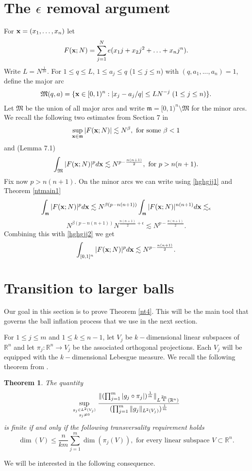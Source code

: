 \documentclass[amssymb,amsfonts,12pt]{amsart}
\newtheorem{theorem}{Theorem}[section]
\def\R{{\mathbb R}}
\def\M{{\mathfrak M}}\def\G{{\bf Gr}}\def\m{{\mathfrak m}}
\begin{document}
\section{The $\epsilon$ removal argument}
For ${\bf x}=(x_1,\ldots,x_n)$ let
$$F({\bf x};N)=\sum_{j=1}^Ne(x_1j+x_2j^2+\ldots+ x_n j^n).$$
Write $L=N^{\frac1{2n}}$. For $1\le q\le L$, $1\le a_j\le q$ ($1\le j\le n$) with $(q,a_1,...,a_n)=1$, define the major arc
$$\M(q,a)=\{\x\in[0,1)^n:|x_j-a_j/q|\le LN^{-j}\;(1\le j\le n)\}.$$
Let $\M$ be the union of all major arcs and write $\m=[0,1)^n\setminus\M$ for the minor arcs. We recall the following two estimates from Section 7 in \cite{Wool1}
\begin{equation}
\label{hghgjj1}
\sup_{\x\in\m}|F(\x;N)|\lesssim N^{\beta},\text{ for some }\beta<1
\end{equation}
and (Lemma 7.1)
\begin{equation}
\label{hghgjj2}
\int_{\M}|F(\x;N)|^{p}d\x\lesssim N^{p-\frac{n(n+1)}{2}}, \text{ for }p>n(n+1).
\end{equation}
\bigskip
Fix now $p>n(n+1)$. On the minor arcs we can write using \eqref{hghgjj1} and Theorem \ref{ntmain1}
$$\int_{\m}|F(\x;N)|^{p}d\x\lesssim N^{\beta(p-n(n+1))}\int_{\m}|F(\x;N)|^{n(n+1)}d\x\lesssim_\epsilon$$
$$N^{\beta(p-n(n+1))}N^{\frac{n(n+1)}{2}+\epsilon}\lesssim N^{p-\frac{n(n+1)}2}.$$
Combining this with \eqref{hghgjj2} we get
\begin{equation}
\label{hghgjj3}
\int_{[0,1]^n}|F({\bf x};N)|^{p}d{\bf x}\lesssim  N^{p-\frac{n(n+1)}2}.
\end{equation}

\section{Transition to larger balls}
\label{nS1}

Our goal in this section is to prove Theorem \ref{nt4}. This will be the main tool that governs the ball inflation process that we use in the next section.

For $1\le j\le m$ and $1\le k\le n-1$, let $V_j$ be $k-$dimensional linear subspaces of $\R^n$ and let $\pi_j:\R^n\to V_j$ be the associated orthogonal projections.  Each $V_j$ will be equipped with the $k-$dimensional Lebesgue measure. We recall the following theorem from \cite{BCCT}.
\begin{theorem}
\label{BCCT1}
The quantity
$$\sup_{g_j\in L^{2}({V_j})\atop{g_j\not\equiv 0}}\frac{\|(\prod_{j=1}^{m}|g_j\circ \pi_j|)^{\frac1{m}}\|_{L^{\frac{2n}{k}}(\R^n)}}{(\prod_{j=1}^{m}\|g_j\|_{L^{2}(V_j)})^{\frac1{m}}}$$
is finite if and only if the following transversality requirement holds
\begin{equation}
\label{fek3}
\dim(V)\le \frac{n}{km}\sum_{j=1}^{m}{\dim(\pi_j(V))}, \text{ for every linear subspace }V\subset \R^n.
\end{equation}
\end{theorem}
We will be interested in the following consequence.
\end{document}
